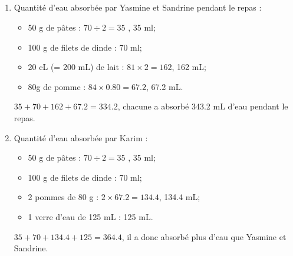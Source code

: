 \documentclass[12pt,a4paper]{article}
\begin{document}
\subsection*{}
\begin{enumerate}[label=\alph*)]
	\item Quantité d'eau absorbée par Yasmine et Sandrine pendant le repas :
		\begin{itemize}
			\item 50 g de pâtes : $70 \div 2 = 35$ , 35 ml;
			\item 100 g de filets de dinde : 70 ml;
			\item 20 cL (= 200 mL) de lait : $81 \times 2 = 162$, 162 mL;
			\item 80g de pomme : $84 \times \num{0.80} = \num{67.2}$, \num{67,2} mL.
		\end{itemize}
		$35 + 70 + 162 + \num{67.2} = \num{334,2}$, chacune a absorbé \num{343.2} mL d'eau pendant le repas.
	
	
	\item Quantité d'eau absorbée par Karim :
		
		\begin{itemize}
			\item 50 g de pâtes : $70 \div 2 = 35$ , 35 ml;
			\item 100 g de filets de dinde : 70 ml;
			\item 2 pommes de 80 g : $2 \times \num{67.2} = \num{134.4}$, \num{134.4} mL;
			\item 1 verre d'eau de 125 mL : 125 mL.
		\end{itemize}
		$35 + 70 + \num{134.4} + 125 = \num{364,4}$, il a donc absorbé plus d'eau que Yasmine et Sandrine.
\end{enumerate}
\end{document}

